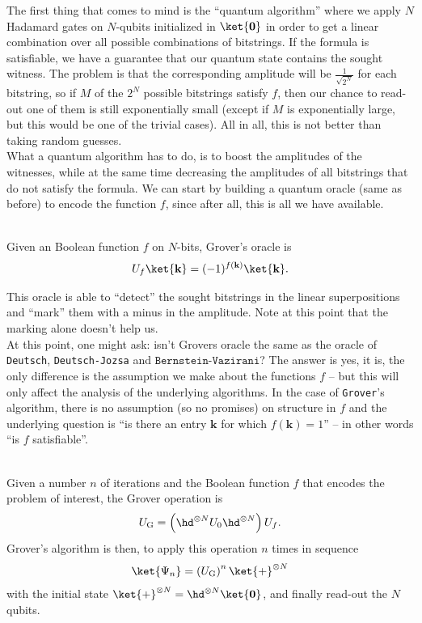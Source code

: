 The first thing that comes to mind is the ``quantum algorithm'' where we apply $N$ Hadamard gates on $N$-qubits initialized in $\ket{\mathbf{0}}$ in order to get a linear combination over all possible combinations of bitstrings. If the formula is satisfiable, we have a guarantee that our quantum state contains the sought witness. The problem is that the corresponding amplitude will be $\frac{1}{\sqrt{2^N}}$ for each bitstring, so if $M$ of the $2^N$ possible bitstrings satisfy $f$, then our chance to read-out one of them is still exponentially small (except if $M$ is exponentially large, but this would be one of the trivial cases). All in all, this is not better than taking random guesses.\\
What a quantum algorithm has to do, is to boost the amplitudes of the witnesses, while at the same time decreasing the amplitudes of all bitstrings that do not satisfy the formula. We can start by building a quantum oracle (same as before) to encode the function $f$, since after all, this is all we have available.
\begin{def*}\phantom{,,,}\\
Given an Boolean function $f$ on $N$-bits, Grover's oracle is 
\begin{align}
    U_f\ket{\mathbf{k}} = (-1)^{f(\mathbf{k})}\ket{\mathbf{k}}.
\end{align}
\end{def*}
This oracle is able to ``detect'' the sought bitstrings in the linear superpositions and ``mark'' them with a minus in the amplitude. Note at this point that the marking alone doesn't help us.\\
At this point, one might ask: isn't Grovers oracle the same as the oracle of \texttt{Deutsch}, \texttt{Deutsch-Jozsa} and $\texttt{Bernstein-Vazirani}$? The answer is yes, it is, the only difference is the assumption we make about the functions $f$ -- but this will only affect the analysis of the underlying algorithms. In the case of \texttt{Grover}'s algorithm, there is no assumption (so no promises) on structure in $f$ and the underlying question is ``is there an entry $\mathbf{k}$ for which $f(\mathbf{k})=1$'' -- in other words ``is $f$ satisfiable''.
\begin{algo*}\phantom{...}\\
Given a number $n$ of iterations and the Boolean function $f$ that encodes the problem of interest, the Grover operation is
\begin{align}
    U_\text{G}=\left(\hd^{\otimes N}U_0 \hd^{\otimes N}\right) U_f.
\end{align}
Grover's algorithm is then, to apply this operation $n$ times in sequence
\begin{align}
    \ket{\Psi_n} = \left(U_\text{G}\right)^n \ket{+}^{\otimes N} 
\end{align}
with the initial state $\ket{+}^{\otimes N} = \hd^{\otimes N}\ket{\mathbf{0}}$, and finally read-out the $N$ qubits.
\end{algo*}

